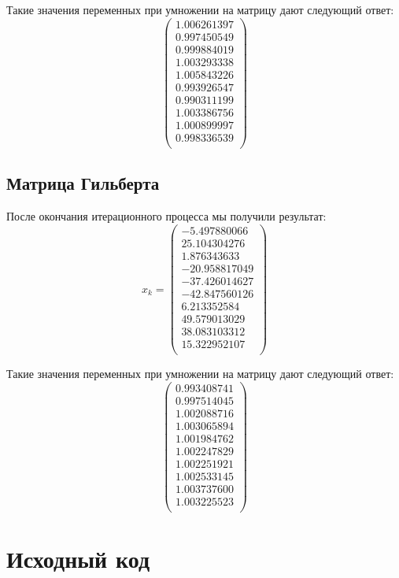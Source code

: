 \documentclass[../../report.tex]{subfiles}
\begin{document}
Такие значения переменных при умножении на матрицу дают следующий ответ:
\[
\begin{pmatrix}
    1.006261397 \\
    0.997450549 \\
    0.999884019 \\
    1.003293338 \\
    1.005843226 \\
    0.993926547 \\
    0.990311199 \\
    1.003386756 \\
    1.000899997 \\
    0.998336539 \\
\end{pmatrix}
\]

\subsection{Матрица Гильберта}
После окончания итерационного процесса мы получили результат:
\[
x_{k} = 
\begin{pmatrix}
    -5.497880066 \\
    25.104304276 \\
     1.876343633 \\
   -20.958817049 \\
   -37.426014627 \\
   -42.847560126 \\
     6.213352584 \\
    49.579013029 \\
    38.083103312 \\
    15.322952107 \\
\end{pmatrix}
\]

Такие значения переменных при умножении на матрицу дают следующий ответ:
\[
\begin{pmatrix}
    0.993408741 \\
    0.997514045 \\
    1.002088716 \\
    1.003065894 \\
    1.001984762 \\
    1.002247829 \\
    1.002251921 \\
    1.002533145 \\
    1.003737600 \\
    1.003225523 \\
\end{pmatrix}
\]

\section{Исходный код}
\end{document}
